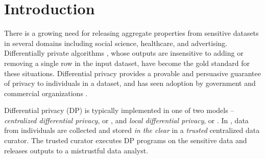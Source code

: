 \section{Introduction}
\cbstart

There is a growing need for releasing aggregate properties from sensitive datasets in several domains  including social science, healthcare, and advertising. Differentially private algorithms \cite{dwork}, whose outputs are insensitive to adding or removing a single row in the input dataset, have become the gold standard for these situations. Differential privacy provides a provable and persuasive guarantee of privacy to individuals in a dataset, and has seen adoption by government \cite{machanavajjhala08onthemap,Vilhuber17Proceedings} and commercial organizations \cite{Rappor1,Apple, Samsung}. %

Differential privacy (DP) is typically implemented in one of two models -- \textit{centralized differential privacy}, or \cdp, and \textit{local differential privacy}, or \ldp. In \cdp, data from individuals are collected and stored \textit{in the clear} in a \textit{trusted} centralized data curator. The trusted curator executes DP programs on the sensitive data  and releases outputs to a mistrustful data analyst. %


